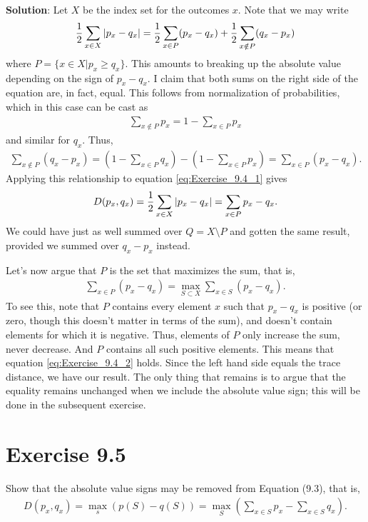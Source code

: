 \documentclass{book}
\begin{document}
    \textbf{Solution}: Let $X$ be the index set for the outcomes $x$. Note that we may write
    \begin{align} \label{eq:Exercise_9.4_1}
        \frac{1}{2}\sum_{x\in X} \abs{p_x-q_x} = \frac{1}{2}\sum_{x\in P} (p_x-q_x) + \frac{1}{2} \sum_{x\notin P} (q_x-p_x)
    \end{align}
    where $P = \{x\in X| p_x \geq q_x\}$. This amounts to breaking up the absolute value depending on the sign of $p_x-q_x$. I claim that both sums on the right side of the equation are, in fact, equal. This follows from normalization of probabilities, which in this case can be cast as 
    \begin{align}
        \sum_{x\notin P} p_x = 1-\sum_{x\in P} p_x
    \end{align}
    and similar for $q_x$. Thus,
    \begin{align}
        \sum_{x\notin P} (q_x-p_x) = (1-\sum_{x\in P}q_x) - (1-\sum_{x\in P}p_x) = \sum_{x\in P }(p_x - q_x).
    \end{align}
    Applying this relationship to equation \eqref{eq:Exercise_9.4_1} gives
    \begin{align}
        D(p_x, q_x) = \frac{1}{2}\sum_{x\in X} \abs{p_x-q_x} = \sum_{x\in P} p_x - q_x.
    \end{align}
    We could have just as well summed over $Q = X\setminus P$ and gotten the same result, provided we summed over $q_x-p_x$ instead. 
    
    Let's now argue that $P$ is the set that maximizes the sum, that is,
    \begin{align} \label{eq:Exercise_9.4_2}
        \sum_{x\in P } (p_x-q_x) = \max_{S\subset X} \sum_{x\in S} (p_x -q_x).
    \end{align}
    To see this, note that $P$ contains every element $x$ such that $p_x-q_x$ is positive (or zero, though this doesn't matter in terms of the sum), and doesn't contain elements for which it is negative. Thus, elements of $P$ only increase the sum, never decrease. And $P$ contains all such positive elements. This means that equation \eqref{eq:Exercise_9.4_2} holds. Since the left hand side equals the trace distance, we have our result. The only thing that remains is to argue that the equality remains unchanged when we include the absolute value sign; this will be done in the subsequent exercise. 
    
\section*{Exercise 9.5}
    Show that the absolute value signs may be removed from Equation (9.3), that is,
    \begin{align}
        D(p_x, q_x) = \max_s (p(S)-q(S)) = \max_S \left(\sum_{x\in S} p_x -\sum_{x\in S} q_x\right).
    \end{align}
    
\end{document}
